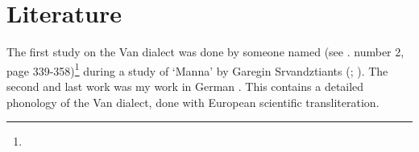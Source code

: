 \section{Literature}

The first study on the Van dialect was done by someone named  (see . number 2, page 339-358)\footnote{} during a study of `Manna' \citep{manana} by Garegin Srvandztiants (; ). The second and last work was my work in German \citep{adjarian-1901-lautlehreVan}. This contains a detailed phonology of the Van dialect, done with European scientific transliteration. 

{\litoverview}

